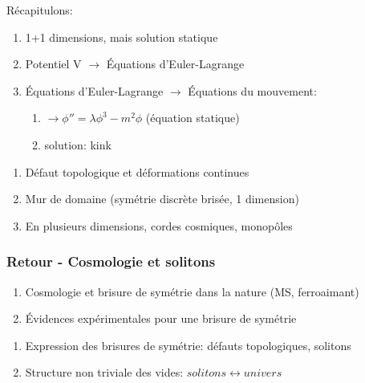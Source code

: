 \documentclass[handout]{beamer}
\begin{document}
\begin{frame}
Récapitulons:
\begin{enumerate}
\item 1+1 dimensions, mais solution statique
\item Potentiel V $\rightarrow$ Équations d'Euler-Lagrange 
\item Équations d'Euler-Lagrange $\rightarrow$ Équations du mouvement: 
\begin{enumerate}
\item $\rightarrow \phi'' = \lambda \phi^3 - m^2 \phi$ (équation statique)
\item solution: kink
\end{enumerate}
\end{enumerate}
\end{frame}

\begin{frame}
\begin{figure}
\end{figure}
\begin{enumerate}
\item Défaut topologique et déformations continues
\item Mur de domaine (symétrie discrète brisée, 1 dimension)
\item En plusieurs dimensions, cordes cosmiques, monopôles
\end{enumerate}
\end{frame}

\begin{frame}\frametitle{Retour - Cosmologie et solitons}
\begin{enumerate}
\item Cosmologie et brisure de symétrie dans la nature (MS, ferroaimant)
\item Évidences expérimentales pour une brisure de symétrie
\end{enumerate}
\begin{enumerate}
\item Expression des brisures de symétrie: défauts topologiques, solitons
\item Structure non triviale des vides: $solitons \leftrightarrow univers$
\end{enumerate}



\end{frame}
\end{document}

